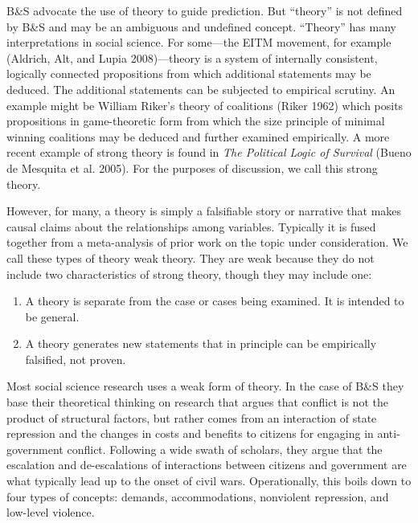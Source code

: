 \documentclass[
]{article}
\providecommand{\tightlist}{%
  \setlength{\itemsep}{0pt}\setlength{\parskip}{0pt}}
\begin{document}
B\&S advocate the use of theory to guide prediction. But ``theory'' is not defined by B\&S and may be an ambiguous and undefined concept. ``Theory'' has many interpretations in social science. For some---the EITM movement, for example (Aldrich, Alt, and Lupia 2008)---theory is a system of internally consistent, logically connected propositions from which additional statements may be deduced. The additional statements can be subjected to empirical scrutiny. An example might be William Riker's theory of coalitions (Riker 1962) which posits propositions in game-theoretic form from which the size principle of minimal winning coalitions may be deduced and further examined empirically. A more recent example of strong theory is found in \emph{The Political Logic of Survival} (Bueno de Mesquita et al. 2005). For the purposes of discussion, we call this strong theory.

However, for many, a theory is simply a falsifiable story or narrative that makes causal claims about the relationships among variables. Typically it is fused together from a meta-analysis of prior work on the topic under consideration. We call these types of theory weak theory. They are weak because they do not include two characteristics of strong theory, though they may include one:

\begin{enumerate}
\def\labelenumi{\arabic{enumi}.}
\tightlist
\item
  A theory is separate from the case or cases being examined. It is intended to be general.
\item
  A theory generates new statements that in principle can be empirically falsified, not proven.
\end{enumerate}

Most social science research uses a weak form of theory. In the case of B\&S they base their theoretical thinking on research that argues that conflict is not the product of structural factors, but rather comes from an interaction of state repression and the changes in costs and benefits to citizens for engaging in anti-government conflict. Following a wide swath of scholars, they argue that the escalation and de-escalations of interactions between citizens and government are what typically lead up to the onset of civil wars. Operationally, this boils down to four types of concepts: demands, accommodations, nonviolent repression, and low-level violence.
\end{document}
